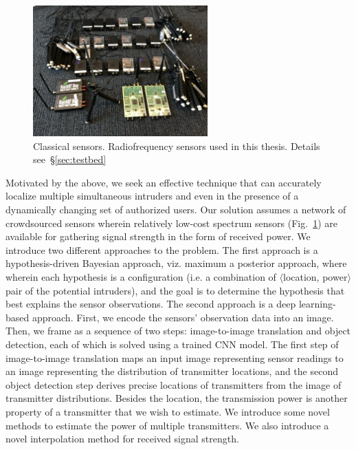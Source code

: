 \begin{figure}[t]
      \centering
      \includegraphics[width=0.6\textwidth]{figures/SDR.png}
      \caption{Classical sensors. Radiofrequency sensors used in this thesis. Details see~\S\ref{sec:testbed}} 
      \label{fig:intro-sdr}
\end{figure}

Motivated by the above, we seek an effective technique that can accurately localize multiple simultaneous
intruders and even in the presence of a dynamically changing set of authorized users.
Our solution assumes a network of crowdsourced sensors wherein relatively low-cost spectrum sensors (Fig.~\ref{fig:intro-sdr}) are available
for gathering signal strength in the form of received power.
We introduce two different approaches to the \mtl problem.
The first approach is a hypothesis-driven Bayesian approach, viz. maximum a posterior approach, where wherein each hypothesis is a configuration
(i.e. a combination of $\langle$location, power$\rangle$ pair of the potential intruders), and the goal is to determine the hypothesis 
that best explains the sensor observations.
The second approach is a deep learning-based approach. First, we encode the sensors' observation data into an image.
Then, we frame \mtl as a sequence of two steps: image-to-image translation 
and object detection, each of which is solved using a trained CNN model. 
The first step of image-to-image translation maps an input image representing sensor readings to an image
representing the distribution of transmitter locations, and the second object detection step derives precise locations of
transmitters from the image of transmitter distributions. 
Besides the location, the transmission power is another property of a transmitter that we wish to estimate.
We introduce some novel methods to estimate the power of multiple transmitters.
We also introduce a novel interpolation method for received signal strength.


